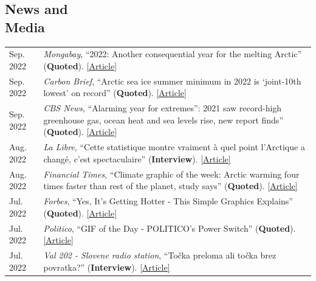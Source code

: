 \documentclass[margin,line,palatino,courier,10pt]{res}
\begin{document}
\begin{resume}
\section{\sc \textcolor{Cerulean}{\large{\textbf{News and\\ Media}}}}
\vspace*{0.04in}
\begin{tabular}{@{}p{0.9in}p{4in}}
Sep. 2022 & \textit{Mongabay}, ``2022: Another consequential year for the melting Arctic'' (\textbf{Quoted}). \href{https://news.mongabay.com/2022/09/2022-another-consequential-year-for-the-melting-arctic/}{[Article]}\\
Sep. 2022 & \textit{Carbon Brief}, ``Arctic sea ice summer minimum in 2022 is `joint-10th lowest' on record'' (\textbf{Quoted}). \href{https://www.carbonbrief.org/arctic-sea-ice-summer-minimum-in-2022-is-joint-10th-lowest-on-record/}{[Article]}\\
Sep. 2022 & \textit{CBS News}, ``Alarming year for extremes'': 2021 saw record-high greenhouse gas, ocean heat and sea levels rise, new report finds'' (\textbf{Quoted}). \href{https://www.cbsnews.com/news/2021-record-high-greenhouse-gases-ocean-heat-and-sea-level-rise-extreme-heat/}{[Article]}\\
Aug. 2022 & \textit{La Libre}, ``Cette statistique montre vraiment \`{a} quel point l'Arctique a chang\'{e}, c'est spectaculaire'' (\textbf{Interview}). \href{https://www.lalibre.be/planete/environnement/2022/08/17/cette-statistique-montre-vraiment-a-quel-point-larctique-a-change-cest-spectaculaire-FGU5ABQZB5F6XINIL5ZBBB3CXM/}{[Article]}\\
Aug. 2022 & \textit{Financial Times}, ``Climate graphic of the week: Arctic warming four times faster than rest of the planet, study says'' (\textbf{Quoted}). \href{https://www.ft.com/content/9bb32c6f-b3dc-46bd-944e-9e583407b866}{[Article]}\\
Jul. 2022 & \textit{Forbes}, ``Yes, It’s Getting Hotter - This Simple Graphics Explains'' (\textbf{Quoted}). \href{https://www.forbes.com/sites/marshallshepherd/2022/07/19/yes-its-getting-hotterthis-simple-graphics-explains/}{[Article]}\\
Jul. 2022 & \textit{Politico}, ``GIF of the Day - POLITICO's Power Switch'' (\textbf{Quoted}). \href{https://www.politico.com/newsletters/power-switch/2022/07/15/time-for-bidens-beast-mode-00046061}{[Article]}\\
Jul. 2022 & \textit{Val 202 - Slovene radio station}, ``To\v{c}ka preloma ali to\v{c}ka brez povratka?'' (\textbf{Interview}). \href{https://val202.rtvslo.si/podkast/vroci-mikrofon/584/174886447}{[Article]}\\

\end{tabular}
\end{resume}
\end{document}
